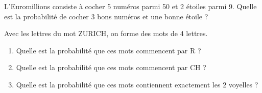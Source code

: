 \begin{exercice}L'Euromillions consiste à cocher 5 numéros parmi 50 et 2 étoiles parmi 9.
Quelle est la probabilité de cocher 3 bons numéros et une bonne étoile ?
\end{exercice}

\begin{exercice}
Avec les lettres du mot ZURICH, on forme des mots de 4 lettres.
\begin{enumerate}
\item Quelle est la probabilité que ces mots commencent par R ?
\item Quelle est la probabilité que ces mots commencent par CH ?
\item Quelle est la probabilité que ces mots contiennent exactement les 2 voyelles ?
\end{enumerate}
\end{exercice}